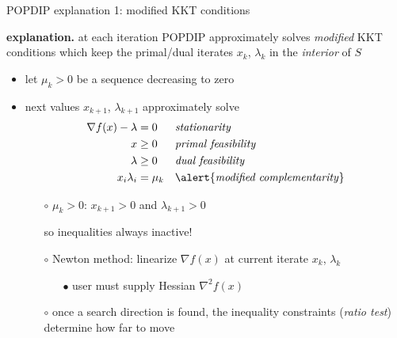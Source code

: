 \documentclass[10pt,hyperref,dvipsnames]{beamer}
\newcommand{\grad}{\nabla}
\begin{document}
\begin{frame}{POPDIP explanation 1: modified KKT conditions}

\textbf{explanation.}  at each iteration POPDIP approximately solves \emph{modified} KKT conditions which keep the primal/dual iterates $x_k$, $\lambda_k$ in the \emph{interior} of $S$

\bigskip
\begin{itemize}
\item let $\mu_k>0$ be a sequence decreasing to zero
\item next values $x_{k+1}$, $\lambda_{k+1}$ approximately solve
\begin{align*}
\grad f(x) - \lambda &= 0   &&\text{\emph{stationarity}} \\
                   x &\ge 0 &&\text{\emph{primal feasibility}} \\
             \lambda &\ge 0 &&\text{\emph{dual feasibility}} \\
       x_i \lambda_i &= \mu_k && \text{\alert{\emph{modified complementarity}}}
\end{align*}

    \begin{itemize}
    \item[$\circ$] $\mu_k>0$: \quad $x_{k+1} > 0$ and $\lambda_{k+1} > 0$
    \item[] \phantom{$\mu_k>0$:} \quad so inequalities always inactive!
    \item[$\circ$] Newton method: linearize $\grad f(x)$ at current iterate $x_k$, $\lambda_k$
        \begin{itemize}
        \item[$\bullet$] user must supply Hessian $\grad^2 f(x)$
        \end{itemize}
    \item[$\circ$] once a search direction is found, the inequality constraints (\emph{ratio test}) determine how far to move
    \end{itemize}
\end{itemize}
\end{frame}
\end{document}
